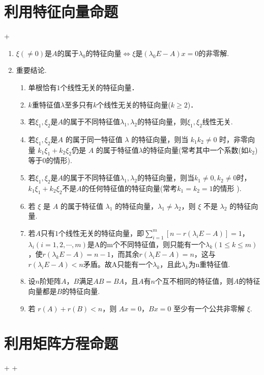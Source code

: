 \section{利用特征向量命题}
\DOne + \DTwoTwo
\begin{enumerate}
    \item $\xi(\neq0)$是$A$的属于$\lambda_{0}$的特征向量$\Leftrightarrow\xi$是$(\lambda_{0}E-A)x=0$的非零解.\DTwoTwo
    \item 重要结论.
          \begin{enumerate}
              \item 单根恰有$1$个线性无关的特征向量．
              \item $k$重特征值$\lambda$至多只有$k$个线性无关的特征向量($k≥2$)．
              \item 若$\xi_1,\xi_2$是$A$的属于不同特征值$\lambda_1,\lambda_2$的特征向量，则$\xi_1,\xi_2$线性无关.
              \item 若$\xi_1,\xi_2$是$A$ 的属于同一特征值 $\lambda$ 的特征向量，则当 $k_1k_2\neq0$ 时，非零向量 $k_1\xi_1+k_2\xi_2$仍是 $A$ 的属于特征值$\lambda$的特征向量(常考其中一个系数(如$k_2$)等于0的情形).
              \item 若$\xi_1,\xi_2$是$A$的属于不同特征值$\lambda_1,\lambda_2$的特征向量，则当$k_1\neq0,k_2\neq0$时，$k_1\xi_1+k_2\xi_2$不是$A$的任何特征值的特征向量(常考$k_1=k_2=1$的情形 ).
              \item 若 $\xi$ 是 $A$ 的属于特征值 $\lambda_1$ 的特征向量，$\lambda_1 \neq \lambda_2$，则 $\xi$ 不是 $\lambda_2$ 的特征向量.
              \item 若$A$只有$1$个线性无关的特征向量，即$\sum_{i=1}^{m}[n-r(\lambda_{i}E-A)]=1$，$\lambda_{i}(i=1,2,\cdots,m)$是A的m个不同特征值，则只能有一个$\lambda_{k}(1\leqslant k\leqslant m)$，使$r(\lambda_{k}E-A)=n-1$，而其余$r(\lambda_{i}E-A)=n$，这与$r(\lambda_{i}E-A)<n$矛盾。故A只能有一个$\lambda_{k}$，且此$\lambda_{k}$为n重特征值.
              \item 设$n$阶矩阵$A，B$满足$AB=BA$，且$A$有$n$个互不相同的特征值，则$A$的特征向量都是$B$的特征向量.
              \item 若 $r(A) + r(B) < n$，则 $Ax = 0$，$Bx = 0$ 至少有一个公共非零解 $\xi$.
          \end{enumerate}
\end{enumerate}
\section{利用矩阵方程命题}
\DOne + \DTwoTwo + \DTwoThree

